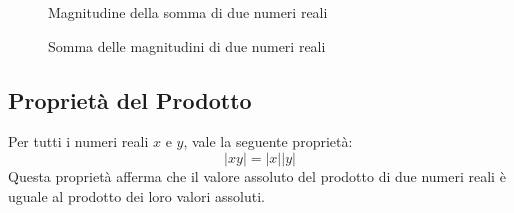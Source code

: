 \documentclass{book}
\begin{document}
\begin{figure}[H]
    \centering
    \caption{Magnitudine della somma di due numeri reali}
\end{figure}

\begin{figure}[H]
    \centering
    \caption{Somma delle magnitudini di due numeri reali}
\end{figure}

\begin{theorem}
    \subsection{Proprietà del Prodotto}
    Per tutti i numeri reali \( x \) e \( y \), vale la seguente proprietà:
    \[ |xy| = |x||y| \]
    Questa proprietà afferma che il valore assoluto del prodotto di due numeri reali è uguale al prodotto dei loro valori assoluti.
\end{theorem}
\end{document}
